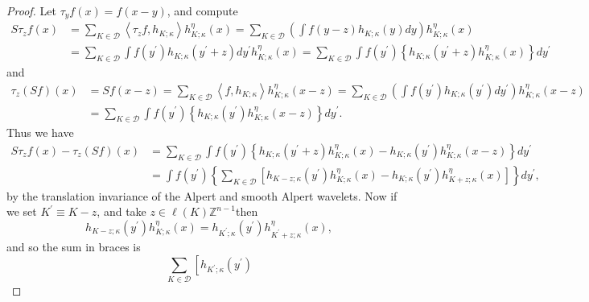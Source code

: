 \documentclass{amsart}%
\theoremstyle{plain}
\numberwithin{equation}{section}
\begin{document}
\begin{proof}
Let $\tau_{y}f\left(  x\right)  =f\left(  x-y\right)  $, and compute%
\begin{align*}
S\tau_{z}f\left(  x\right)   & =\sum_{K\in\mathcal{D}}\left\langle \tau
_{z}f,h_{K;\kappa}\right\rangle h_{K;\kappa}^{\eta}\left(  x\right)
=\sum_{K\in\mathcal{D}}\left(  \int f\left(  y-z\right)  h_{K;\kappa}\left(
y\right)  dy\right)  h_{K;\kappa}^{\eta}\left(  x\right) \\
& =\sum_{K\in\mathcal{D}}\int f\left(  y^{\prime}\right)  h_{K;\kappa}\left(
y^{\prime}+z\right)  dy^{\prime}h_{K;\kappa}^{\eta}\left(  x\right)
=\sum_{K\in\mathcal{D}}\int f\left(  y^{\prime}\right)  \left\{  h_{K;\kappa
}\left(  y^{\prime}+z\right)  h_{K;\kappa}^{\eta}\left(  x\right)  \right\}
dy^{\prime}%
\end{align*}
and%
\begin{align*}
\tau_{z}\left(  Sf\right)  \left(  x\right)   & =Sf\left(  x-z\right)
=\sum_{K\in\mathcal{D}}\left\langle f,h_{K;\kappa}\right\rangle h_{K;\kappa
}^{\eta}\left(  x-z\right)  =\sum_{K\in\mathcal{D}}\left(  \int f\left(
y^{\prime}\right)  h_{K;\kappa}\left(  y^{\prime}\right)  dy^{\prime}\right)
h_{K;\kappa}^{\eta}\left(  x-z\right) \\
& =\sum_{K\in\mathcal{D}}\int f\left(  y^{\prime}\right)  \left\{
h_{K;\kappa}\left(  y^{\prime}\right)  h_{K;\kappa}^{\eta}\left(  x-z\right)
\right\}  dy^{\prime}.
\end{align*}
Thus we have%
\begin{align*}
S\tau_{z}f\left(  x\right)  -\tau_{z}\left(  Sf\right)  \left(  x\right)   &
=\sum_{K\in\mathcal{D}}\int f\left(  y^{\prime}\right)  \left\{  h_{K;\kappa
}\left(  y^{\prime}+z\right)  h_{K;\kappa}^{\eta}\left(  x\right)
-h_{K;\kappa}\left(  y^{\prime}\right)  h_{K;\kappa}^{\eta}\left(  x-z\right)
\right\}  dy^{\prime}\\
& =\int f\left(  y^{\prime}\right)  \left\{  \sum_{K\in\mathcal{D}}\left[
h_{K-z;\kappa}\left(  y^{\prime}\right)  h_{K;\kappa}^{\eta}\left(  x\right)
-h_{K;\kappa}\left(  y^{\prime}\right)  h_{K+z;\kappa}^{\eta}\left(  x\right)
\right]  \right\}  dy^{\prime},
\end{align*}
by the translation invariance of the Alpert and smooth Alpert wavelets. Now if
we set $K^{\prime}\equiv K-z$, and take $z\in\ell\left(  K\right)
\mathbb{Z}^{n-1}$then%
\[
h_{K-z;\kappa}\left(  y^{\prime}\right)  h_{K;\kappa}^{\eta}\left(  x\right)
=h_{K^{\prime};\kappa}\left(  y^{\prime}\right)  h_{K^{\prime}+z;\kappa}%
^{\eta}\left(  x\right)  ,
\]
and so the sum in braces is%
\[
\sum_{K\in\mathcal{D}}\left[  h_{K^{\prime};\kappa}\left(  y^{\prime}\right)
\]
\end{proof}
\end{document}
